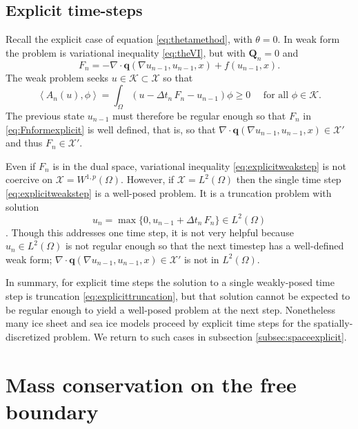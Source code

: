 \documentclass[final,leqno,onefignum,onetabnum]{siamltex1213bueler}
\newcommand\bq{\mathbf{q}}
\newcommand\bQ{\mathbf{Q}}
\newcommand{\Div}{\nabla\cdot}
\renewcommand{\grad}{\nabla}
\newcommand{\ip}[2]{\ensuremath{\left<#1,#2\right>}}
\begin{document}
\subsection{Explicit time-steps} \label{subsec:explicit}  Recall the explicit case of equation \eqref{eq:thetamethod}, with $\theta=0$.  In weak form the problem is variational inequality \eqref{eq:theVI}, but with $\bQ_n=0$ and
\begin{equation}
F_n = - \Div \bq(\grad u_{n-1},u_{n-1},x) + f(u_{n-1},x).  \label{eq:Fnformexplicit}
\end{equation}
The weak problem seeks $u\in\mathcal{K} \subset \mathcal{X}$ so that
\begin{equation}
\ip{A_n(u)}{\phi} = \int_\Omega (u - \Delta t_n\,F_n - u_{n-1})\phi \ge 0 \quad \text{ for all } \phi \in \mathcal{K}.  \label{eq:explicitweakstep}
\end{equation}
The previous state $u_{n-1}$ must therefore be regular enough so that $F_n$ in \eqref{eq:Fnformexplicit} is well defined, that is, so that $\Div \bq(\grad u_{n-1},u_{n-1},x) \in \mathcal{X}'$ and thus $F_n\in\mathcal{X}'$.

Even if $F_n$ is in the dual space, variational inequality \eqref{eq:explicitweakstep} is not coercive on $\mathcal{X}=W^{1,p}(\Omega)$.  However, if $\mathcal{X}=L^2(\Omega)$ then the single time step \eqref{eq:explicitweakstep} is a well-posed problem.  It is a truncation problem with solution
\begin{equation}
u_n = \max\{0,u_{n-1} + \Delta t_n\,F_n\} \in L^2(\Omega)  \label{eq:explicittruncation}
\end{equation}
\cite[page 27]{KinderlehrerStampacchia1980}.  Though this addresses one time step, it is not very helpful because $u_n \in L^2(\Omega)$ is not regular enough so that the next timestep has a well-defined weak form; $\Div \bq(\grad u_{n-1},u_{n-1},x) \in \mathcal{X}'$ is not in $L^2(\Omega)$.

In summary, for explicit time steps the solution to a single weakly-posed time step is truncation \eqref{eq:explicittruncation}, but that solution cannot be expected to be regular enough to yield a well-posed problem at the next step.  Nonetheless many ice sheet \cite{Bueleretal2005} and sea ice \cite{Thorndikeetal1975} models proceed by explicit time steps for the spatially-discretized problem.  We return to such cases in subsection \ref{subsec:spaceexplicit}.


\section{Mass conservation on the free boundary}  \label{sec:timeseries}
\end{document}
